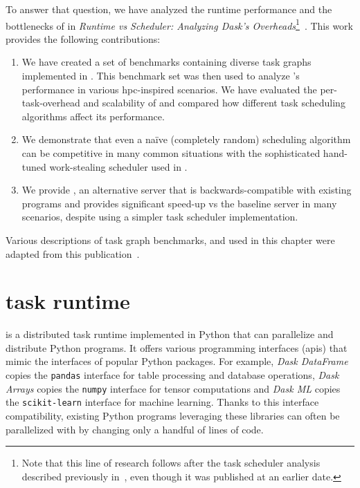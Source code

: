 To answer that question, we have analyzed the runtime performance and the bottlenecks of
\dask{} in
\emph{Runtime vs Scheduler: Analyzing Dask's Overheads}\footnote{Note that this line of research follows after the task scheduler analysis described previously
in~, even though it was published at an earlier date.}~\cite{rsds}. This work
provides the following contributions:
\begin{enumerate}
	\item We have created a set of benchmarks containing diverse task graphs implemented in
	      \dask{}. This benchmark set was then used to analyze \dask{}'s
	      performance in various \gls{hpc}-inspired scenarios. We have evaluated the
	      per-task-overhead and scalability of \dask{} and compared how different task
	      scheduling algorithms affect its performance.
	\item We demonstrate that even a naïve (completely random) scheduling algorithm can be competitive in
	      many common situations with the sophisticated hand-tuned work-stealing scheduler used in
	      \dask{}.
	\item We provide \rsds{}, an alternative \dask{} server that is
	      backwards-compatible with existing \dask{} programs and provides significant
	      speed-up vs the baseline \dask{} server in many scenarios, despite using a
	      simpler task scheduler implementation.
\end{enumerate}

Various descriptions of task graph benchmarks, \dask{} and
\rsds{} used in this chapter were adapted from this
publication~\cite{rsds}.


\section{\dask{} task runtime}
\label{sec:rsds-dask}
\dask{} is a distributed task runtime implemented in Python that can
parallelize and distribute Python programs. It offers various programming interfaces
(\glspl{api}) that mimic the interfaces of popular Python packages. For example,
\emph{Dask DataFrame} copies the \texttt{pandas}
interface for table processing and database operations, \emph{Dask Arrays} copies the
\texttt{numpy} interface for tensor computations and
\emph{Dask ML} copies the \texttt{scikit-learn}
interface for machine learning. Thanks to this interface compatibility, existing Python programs
leveraging these libraries can often be parallelized with \dask{} by changing
only a handful of lines of code.

